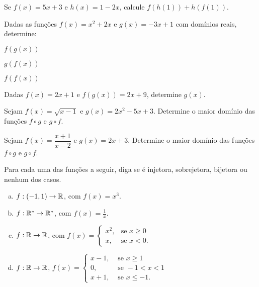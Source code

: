\begin{secExercicios}

\begin{exer}
    Se $f(x)=5x+3$ e $h(x)=1-2x$, calcule $f(h(1))+h(f(1))$.
\end{exer}

\begin{exer}
    Dadas as funções $f(x)=x^2+2x$ e $g(x)=-3x+1$ com domínios reais, determine:
    \begin{enumerate}[a)]
    \begin{multicols}{3}
        \item $f(g(x))$
        \item $g(f(x))$
        \item $f(f(x))$
    \end{multicols}
    \end{enumerate}
\end{exer}

\begin{exer}
    Dadas $f(x)=2x+1$ e $f(g(x))=2x+9$, determine $g(x)$.
\end{exer}

\begin{exer}
    Sejam $f(x)=\sqrt{x-1}$ e $g(x)=2x^2-5x+3$. Determine o maior domínio das funções $f\circ g$ e $g\circ f$.
\end{exer}

\begin{exer}
    Sejam $f(x)=\dfrac{x+1}{x-2}$ e $g(x)=2x+3$. Determine o maior domínio das funções $f\circ g$ e $g\circ f$.
\end{exer}

\begin{exer}
    Para cada uma das funções a seguir, diga se é injetora, sobrejetora, bijetora ou nenhum dos casos.
    \begin{enumerate}[a)]
        \item $f:(-1,1)\to \mathbb{R}$, com $f(x)=x^3$.
        \item $f: \mathbb{R}^*\to\mathbb{R}^*$, com $f(x)=\frac{1}{x}$.
        \item $f:\mathbb{R}\to\mathbb{R}$, com
        $f(x)= \left\{
            \begin{matrix}
                x^2, & \mbox{se } x\geq 0\\
                x, & \mbox{se } x<0.
            \end{matrix}
            \right.$

        \item $f:\mathbb{R}\to\mathbb{R}$,
       $f(x)= \left\{
            \begin{matrix}
                x-1, & \mbox{ se } x\geq 1\\
                0, & \mbox{ se } -1< x< 1\\
                x+1, & \mbox{ se } x\leq -1.
            \end{matrix}
            \right.$
    \end{enumerate}
\end{exer}


\end{secExercicios}
